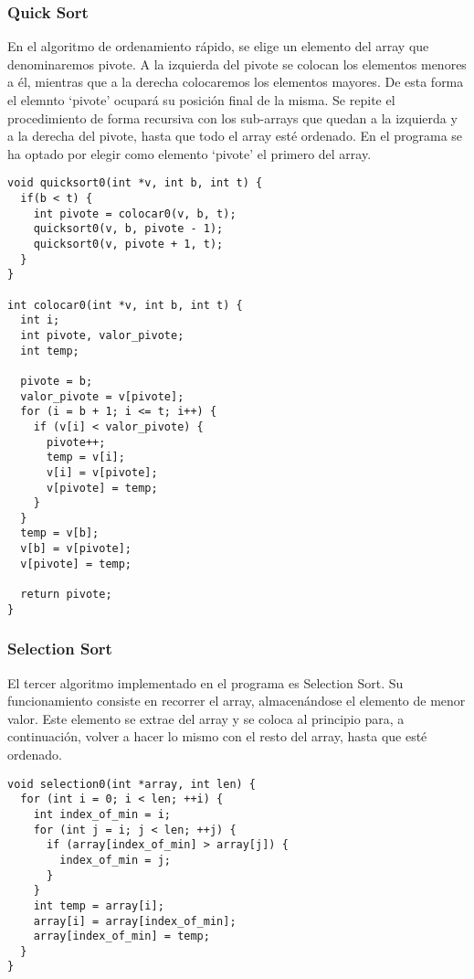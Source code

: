 \subsubsection{Quick Sort}
En el algoritmo de ordenamiento rápido, se elige un elemento del array que denominaremos pivote. A la izquierda del pivote se colocan los elementos menores a él, mientras que a la derecha colocaremos los elementos mayores. De esta forma el elemnto `pivote' ocupará su posición final de la misma. Se repite el procedimiento de forma recursiva con los sub-arrays que quedan a la izquierda y a la derecha del pivote, hasta que todo el array esté ordenado. En el programa se ha optado por elegir como elemento `pivote' el primero del array.
\begin{lstlisting}[caption=Implementación de Quick Sort]
void quicksort0(int *v, int b, int t) {
  if(b < t) {
    int pivote = colocar0(v, b, t);
    quicksort0(v, b, pivote - 1);
    quicksort0(v, pivote + 1, t);
  }
}

int colocar0(int *v, int b, int t) {
  int i;
  int pivote, valor_pivote;
  int temp;

  pivote = b;
  valor_pivote = v[pivote];
  for (i = b + 1; i <= t; i++) {
    if (v[i] < valor_pivote) {
      pivote++;
      temp = v[i];
      v[i] = v[pivote];
      v[pivote] = temp;
    }
  }
  temp = v[b];
  v[b] = v[pivote];
  v[pivote] = temp;

  return pivote;
}
\end{lstlisting}

\subsubsection{Selection Sort}
El tercer algoritmo implementado en el programa es Selection Sort. Su funcionamiento consiste en recorrer el array, almacenándose el elemento de menor valor. Este elemento se extrae del array y se coloca al principio para, a continuación, volver a hacer lo mismo con el resto del array, hasta que esté ordenado.

\begin{lstlisting}[caption=Implementación de Selection Sort]
void selection0(int *array, int len) {
  for (int i = 0; i < len; ++i) {
    int index_of_min = i;
    for (int j = i; j < len; ++j) {
      if (array[index_of_min] > array[j]) {
        index_of_min = j;
      }
    }
    int temp = array[i];
    array[i] = array[index_of_min];
    array[index_of_min] = temp;
  }
}
\end{lstlisting}

